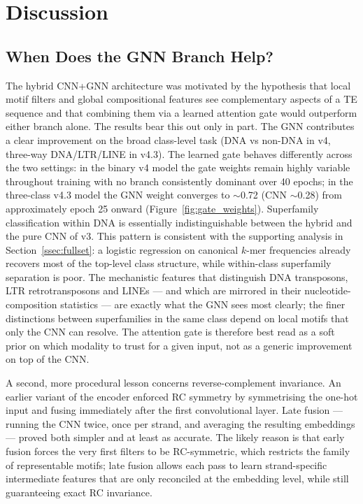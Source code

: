 \documentclass[12pt]{article}
\begin{document}
\clearpage
\section{Discussion}

\subsection{When Does the GNN Branch Help?}\label{ssec:hybrid_disc}

The hybrid CNN+GNN architecture was motivated by the hypothesis that local motif filters and global compositional features see complementary aspects of a TE sequence and that combining them via a learned attention gate would outperform either branch alone. The results bear this out only in part. The GNN contributes a clear improvement on the broad class-level task (DNA vs non-DNA in v4, three-way DNA/LTR/LINE in v4.3). The learned gate behaves differently across the two settings: in the binary v4 model the gate weights remain highly variable throughout training with no branch consistently dominant over 40 epochs; in the three-class v4.3 model the GNN weight converges to $\sim$0.72 (CNN $\sim$0.28) from approximately epoch 25 onward (Figure~\ref{fig:gate_weights}). Superfamily classification within DNA is essentially indistinguishable between the hybrid and the pure CNN of v3. This pattern is consistent with the supporting analysis in Section~\ref{ssec:fullset}: a logistic regression on canonical $k$-mer frequencies already recovers most of the top-level class structure, while within-class superfamily separation is poor. The mechanistic features that distinguish DNA transposons, LTR retrotransposons and LINEs --- and which are mirrored in their nucleotide-composition statistics --- are exactly what the GNN sees most clearly; the finer distinctions between superfamilies in the same class depend on local motifs that only the CNN can resolve. The attention gate is therefore best read as a soft prior on which modality to trust for a given input, not as a generic improvement on top of the CNN.

A second, more procedural lesson concerns reverse-complement invariance. An earlier variant of the encoder enforced RC symmetry by symmetrising the one-hot input and fusing immediately after the first convolutional layer. Late fusion --- running the CNN twice, once per strand, and averaging the resulting embeddings --- proved both simpler and at least as accurate. The likely reason is that early fusion forces the very first filters to be RC-symmetric, which restricts the family of representable motifs; late fusion allows each pass to learn strand-specific intermediate features that are only reconciled at the embedding level, while still guaranteeing exact RC invariance.
\end{document}
